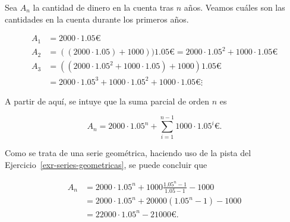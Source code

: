 \documentclass[
  spanish,
  a4paper,
]{scrreport}
\theoremstyle{definition}
\theoremstyle{remark}
\begin{document}
\begin{tcolorbox}[enhanced jigsaw, arc=.35mm, bottomrule=.15mm, bottomtitle=1mm, breakable, colback=white, colbacktitle=quarto-callout-tip-color!10!white, colframe=quarto-callout-tip-color-frame, coltitle=black, left=2mm, leftrule=.75mm, opacityback=0, opacitybacktitle=0.6, rightrule=.15mm, title=\textcolor{quarto-callout-tip-color}{\faLightbulb}\hspace{0.5em}{Solución}, titlerule=0mm, toprule=.15mm, toptitle=1mm]

Sea \(A_n\) la cantidad de dinero en la cuenta tras \(n\) años. Veamos
cuáles son las cantidades en la cuenta durante los primeros años.

\begin{align*}
A_1 &= 2000\cdot 1.05 \mbox{€}\\ 
A_2 &= ((2000\cdot 1.05) + 1000))1.05\mbox{€} = 2000\cdot 1.05^2 + 1000\cdot 1.05\mbox{€}\\ 
A_3 &= ((2000\cdot 1.05^2 + 1000\cdot 1.05)+1000)1.05\mbox{€}\\ 
&= 2000\cdot 1.05^3 + 1000\cdot 1.05^2 + 1000\cdot 1.05\mbox{€}
\vdots
\end{align*}

A partir de aquí, se intuye que la suma parcial de orden \(n\) es

\[
A_n = 2000\cdot 1.05^n + \sum_{i=1}^{n-1} 1000\cdot 1.05^i\mbox{€}.
\]

Como se trata de una serie geométrica, haciendo uso de la pista del
Ejercicio~\ref{exr-series-geometricas}, se puede concluir que

\begin{align*}
A_n &= 2000\cdot 1.05^n + 1000\frac{1.05^n-1}{1.05-1} - 1000\\ 
&= 2000\cdot 1.05^n + 20000 (1.05^n-1) - 1000\\ 
 &= 22000\cdot 1.05^n-21000\mbox{€}.
\end{align*}

\end{tcolorbox}
\end{document}
